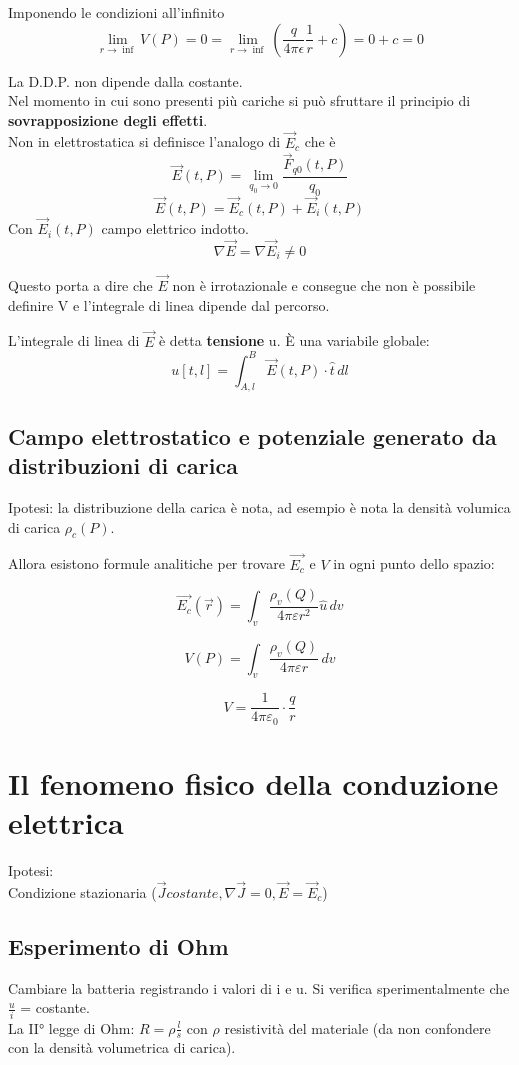Imponendo le condizioni all'infinito
\[
\lim_{r\to\inf}V(P)=0 = \lim_{r\to\inf}(\frac{q}{4\pi\epsilon}\frac{1}{r} + c)  = 0+c = 0
\]

La D.D.P. non dipende dalla costante.\\
Nel momento in cui sono presenti più cariche si può sfruttare il principio di \textbf{sovrapposizione degli effetti}.\\

Non in elettrostatica si definisce l'analogo di $\vec{E}_c$ che è
\[
    \vec{E}(t,P) = \lim_{q_0\to 0}\frac{\vec{F}_{q0}(t,P)}{q_0}
\]
\[
    \vec{E}(t,P) = \vec{E}_c(t,P) + \vec{E}_i(t,P)
\]
Con $\vec{E}_i(t,P)$ campo elettrico indotto.\\

\[\nabla \vec{E} = \nabla \vec{E}_i \not= 0\]

Questo porta a dire che $\vec{E}$ non è irrotazionale e consegue che non è possibile definire V e l'integrale di linea dipende dal percorso.


L'integrale di linea di $\vec{E}$ è detta \textbf{tensione} u. È una variabile globale:
\[
u[t,l] = \int_{A,l}^B\vec{E}(t,P)\cdot\hat{t} \, dl
\]
\subsection{Campo elettrostatico e potenziale generato da distribuzioni di carica}

Ipotesi: la distribuzione della carica è nota, ad esempio è nota la densità volumica di carica $\rho_c(P)$.

Allora esistono formule analitiche per trovare $\vec{E_c}$ e $V$ in ogni punto dello spazio:

\[
\vec{E_c}(\vec{r}) = \int_{v} \frac{\rho_v (Q)}{4\pi \varepsilon r^2} \hat{u} \, dv
\]

\[
V(P) =\int_{v} \frac{\rho_v (Q)}{4\pi \varepsilon r}\, dv
\]

\[
V = \frac{1}{4\pi \varepsilon_0} \cdot \frac{q}{r}
\]

\section{Il fenomeno fisico della conduzione elettrica}
Ipotesi:\\
Condizione stazionaria ($\vec{J} costante, \nabla\vec{J} = 0, \vec{E} = \vec{E}_c$)
\subsection{Esperimento di Ohm}
Cambiare la batteria registrando i valori di i e u. Si verifica sperimentalmente che $\frac{u}{i}$ = costante.\\
La II° legge di Ohm: $R = \rho \frac{l}{s}$ con $\rho$  resistività del materiale (da non confondere con la densità volumetrica di carica).\\

